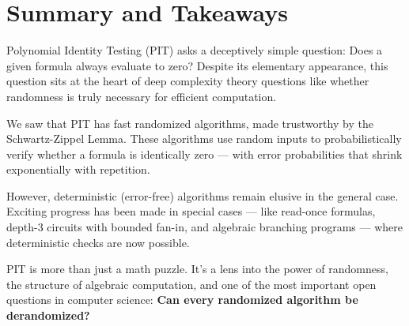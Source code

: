 \section{Summary and Takeaways}

Polynomial Identity Testing (PIT) asks a deceptively simple question: Does a given formula always evaluate to zero? Despite its elementary appearance, this question sits at the heart of deep complexity theory questions like whether randomness is truly necessary for efficient computation.

We saw that PIT has fast randomized algorithms, made trustworthy by the Schwartz-Zippel Lemma. These algorithms use random inputs to probabilistically verify whether a formula is identically zero — with error probabilities that shrink exponentially with repetition.

However, deterministic (error-free) algorithms remain elusive in the general case. Exciting progress has been made in special cases — like read-once formulas, depth-3 circuits with bounded fan-in, and algebraic branching programs — where deterministic checks are now possible.

PIT is more than just a math puzzle. It’s a lens into the power of randomness, the structure of algebraic computation, and one of the most important open questions in computer science: \textbf{Can every randomized algorithm be derandomized?}

